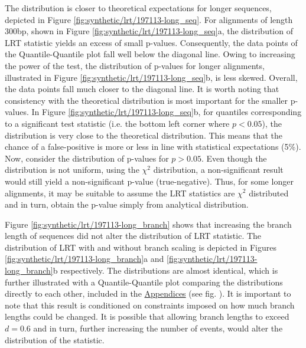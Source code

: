 The distribution is closer to theoretical expectations for longer sequences, depicted in Figure \ref{fig:synthetic/lrt/197113-long_seq}. For alignments of length 300bp, shown in Figure \ref{fig:synthetic/lrt/197113-long_seq}a, the distribution of LRT statistic yields an excess of small p-values. Consequently, the data points of the Quantile-Quantile plot fall well below the diagonal line. Owing to increasing the power of the test, the distribution of p-values for longer alignments, illustrated in Figure \ref{fig:synthetic/lrt/197113-long_seq}b, is less skewed. Overall, the data points fall much closer to the diagonal line. It is worth noting that consistency with the theoretical distribution is most important for the smaller p-values. In Figure \ref{fig:synthetic/lrt/197113-long_seq}b, for quantiles corresponding to a significant test statistic (i.e. the bottom left corner where $p<0.05$), the distribution is very close to the theoretical distribution. This means that the chance of a false-positive is more or less in line with statistical expectations (5\%). Now, consider the distribution of p-values for $p>0.05$. Even though the distribution is not uniform, using the $\chi^{2}$ distribution, a non-significant result would still yield a non-significant p-value (true-negative). Thus, for some longer alignments, it may be suitable to assume the LRT statistics are $\chi^{2}$ distributed and in turn, obtain the p-value simply from analytical distribution. 





Figure \ref{fig:synthetic/lrt/197113-long_branch} shows that increasing the branch length of sequences did not alter the distribution of LRT statistic. The distribution of LRT with and without branch scaling is depicted in Figures \ref{fig:synthetic/lrt/197113-long_branch}a and \ref{fig:synthetic/lrt/197113-long_branch}b respectively. The distributions are almost identical, which is further illustrated with a Quantile-Quantile plot comparing the distributions directly to each other, included in the \hyperref[Appendices]{Appendices} (see fig. ). It is important to note that this result is conditioned on constraints imposed on how much branch lengths could be changed. It is possible that allowing branch lengths to exceed $d=0.6$ and in turn, further increasing the number of events, would alter the distribution of the statistic.





